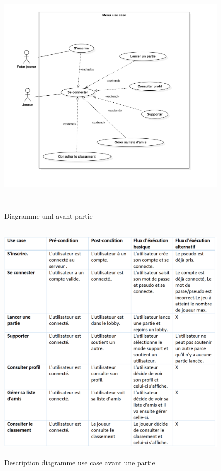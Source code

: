 \documentclass[12pt,a4paper]{article}
\begin{document}
\begin{figure}[H]

\begin{center}
    \includegraphics[height=12cm,width=16.45cm]{menu_use_case.png}
    \caption{Diagramme uml avant partie}   
  \label{fig:picture}
\end{center}
\end{figure}
\par
\begin{figure}[H]

\begin{center}
    \includegraphics[height=12cm,width=16.45cm]{condition.png}
    \caption{Description diagramme use case avant une partie}   
  \label{fig:picture}
\end{center}
\end{figure}
\end{document}
